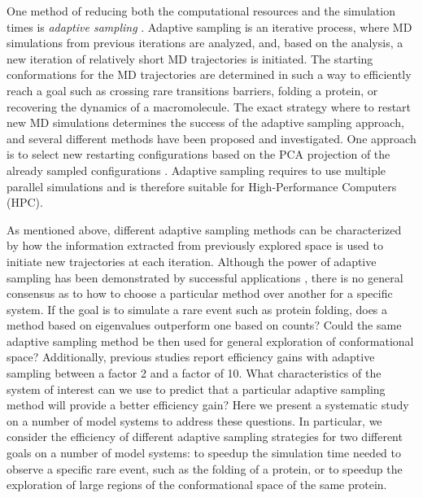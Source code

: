 One method of reducing both the computational resources and the simulation times is \emph{adaptive sampling} \cite{singhal2005error, bowman2010enhanced,
weber2011characterization, Fabritiis-2014, preto2014fast, doerr2016htmd,
AdaptivePELE-Lecina2017, EvolutionCoupling-Shamsi2017, FAST-Bowman-2015, 
Strategies-erros-reduce, plattner2017complete, Adstrategies2018}. 
Adaptive sampling is an iterative process, where MD simulations from previous
iterations are analyzed, and, based on the analysis, a new iteration of relatively
short MD trajectories is initiated. The starting conformations for the
MD trajectories are determined in such a way to efficiently
reach a goal such as crossing rare transitions barriers, folding a protein, or
recovering the dynamics of a macromolecule. The exact strategy where to restart
new MD simulations determines the success of the adaptive sampling approach,
and several different methods have been proposed and investigated\cite{Fabritiis-2014,
AdaptivePELE-Lecina2017, preto2014fast, doerr2016htmd,
weexplore, prattWESTPAAdvancesSampling2018, Adstrategies2018, FUNN, FAST}. One approach is to select new restarting configurations based on the PCA projection of the already sampled configurations \cite{shkurti2019jctc,harada2015jctc,harada2017jctc}. Adaptive sampling
requires to use multiple parallel simulations and is therefore suitable for
High-Performance Computers (HPC).


As mentioned above, different adaptive sampling methods can be characterized by how the
information extracted from previously explored space is used to
initiate new trajectories at each iteration.
Although the power of adaptive sampling has been demonstrated by successful
applications \cite{Wieczorek2016,Plattner20171005,Kohlhoff201415}, there is no general consensus as to how to
choose a particular method over another for a specific system. If the goal is
to simulate a rare event such as protein folding, does a method based on eigenvalues
outperform one based on counts? Could the same adaptive sampling method be then
used for general exploration of conformational space? Additionally, previous
studies \cite{preto2014fast,weber2011characterization,bowman2010enhanced,Fabritiis-2014} report efficiency gains with
adaptive sampling between a factor 2 and a factor of 10. What characteristics of the system of
interest can we use to predict that a particular adaptive sampling method will
provide a better efficiency gain?  Here we present a systematic study on a
number of model systems to address these questions.
In particular, we consider the efficiency of different adaptive sampling strategies for
two different goals on a number of model systems: to speedup the simulation
time needed to observe a specific rare event, such as the folding of a protein,
or to speedup the exploration of large regions of the conformational space of
the same protein.



